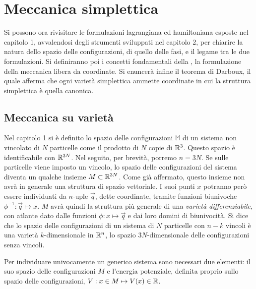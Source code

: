 \chapter{Meccanica simplettica}
Si possono ora rivisitare le formulazioni lagrangiana ed hamiltoniana esposte nel capitolo 1, avvalendosi degli strumenti sviluppati nel capitolo 2, per chiarire la natura dello spazio delle configurazioni, di quello delle fasi, e il legame tra le due formulazioni. Si definiranno poi i concetti fondamentali della , la formulazione della meccanica libera da coordinate. Si enuncerà infine il teorema di Darboux, il quale afferma che ogni varietà simplettica ammette coordinate in cui la struttura simplettica è quella canonica.

\section{Meccanica su varietà}
Nel capitolo 1 si è definito lo spazio delle configurazioni $\mathbb{M}$ di un sistema non vincolato di $N$ particelle come il prodotto di $N$ copie di $\mathbb{R}^{3}$. Questo spazio è identificabile con $\mathbb{R}^{3N}$. Nel seguito, per brevità, porremo $n = 3N$. Se sulle particelle viene imposto un vincolo, lo spazio delle configurazioni del sistema diventa un qualche insieme $M \subset \mathbb{R}^{3N}$. Come già affermato, questo insieme non avrà in generale una struttura di spazio vettoriale. I suoi punti $x$ potranno però essere individuati da $n$-uple $\vec{q}$, dette coordinate, tramite funzioni biunivoche $\phi^{-1}: \vec{q} \mapsto x$. $M$ avrà quindi la struttura più generale di una \emph{varietà differenziabile}, con atlante dato dalle funzioni $\phi: x \mapsto \vec{q}$ e dai loro domini di biunivocità. Si dice che lo spazio delle configurazioni di un sistema di $N$ particelle con $n-k$ vincoli è una varietà $k$-dimensionale  in $\mathbb{R}^{n}$, lo spazio $3N$-dimensionale delle configurazioni senza vincoli.

Per individuare univocamente un generico sistema sono necessari due elementi: il suo spazio delle configurazioni $M$ e l'energia potenziale, definita proprio sullo spazio delle configurazioni, $V: x \in M \mapsto V(x) \in \mathbb{R}$.  


